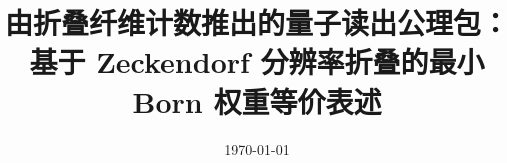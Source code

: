 \documentclass[11pt,letterpaper]{ctexart}
\title{由折叠纤维计数推出的量子读出公理包：\\基于 Zeckendorf 分辨率折叠的最小 Born 权重等价表述}
\author{}
\date{\today}
\begin{document}
\maketitle











\FloatBarrier
\appendix


\FloatBarrier

\end{document}

